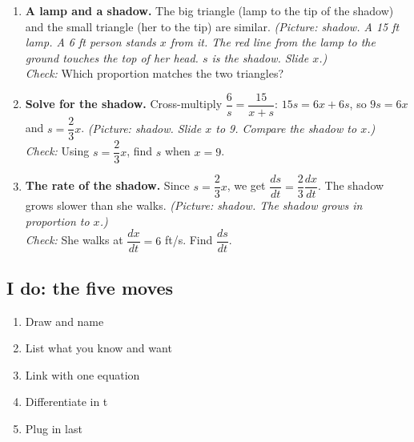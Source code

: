 \documentclass[11pt]{article}
\begin{document}
\begin{enumerate}
\item \textbf{A lamp and a shadow.} The big triangle (lamp to the tip of the shadow) and the small triangle (her to the tip) are similar. \textit{(Picture: shadow. A 15 ft lamp. A 6 ft person stands $x$ from it. The red line from the lamp to the ground touches the top of her head. $s$ is the shadow. Slide $x$.)}\\ \textit{Check:} Which proportion matches the two triangles? 
\item \textbf{Solve for the shadow.} Cross-multiply $\dfrac{6}{s}=\dfrac{15}{x+s}$: $15s=6x+6s$, so $9s=6x$ and $s=\dfrac23x$. \textit{(Picture: shadow. Slide $x$ to 9. Compare the shadow to $x$.)}\\ \textit{Check:} Using $s=\dfrac23x$, find $s$ when $x=9$. 
\item \textbf{The rate of the shadow.} Since $s=\dfrac23x$, we get $\dfrac{ds}{dt}=\dfrac23\dfrac{dx}{dt}$. The shadow grows slower than she walks. \textit{(Picture: shadow. The shadow grows in proportion to $x$.)}\\ \textit{Check:} She walks at $\dfrac{dx}{dt}=6$ ft/s. Find $\dfrac{ds}{dt}$. 
\end{enumerate}
\subsection*{I do: the five moves}\begin{enumerate}\item Draw and name
\item List what you know and want
\item Link with one equation
\item Differentiate in t
\item Plug in last\end{enumerate}
\end{document}
